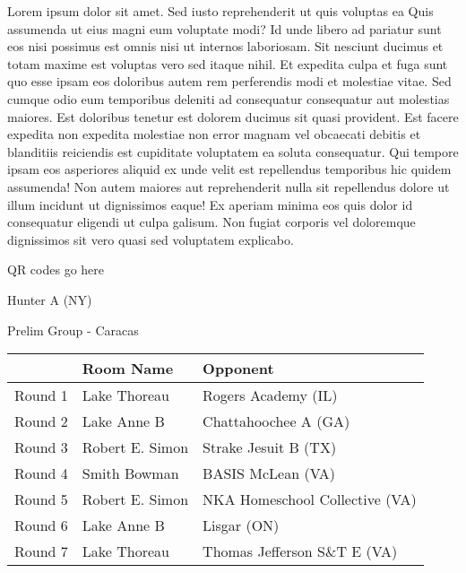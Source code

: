 \documentclass{article}%
\begin{document}
\vspace*{8pt}%
\linebreak%
\newline%
\newline%
Lorem ipsum dolor sit amet. Sed iusto reprehenderit ut quis voluptas ea Quis assumenda ut eius magni eum voluptate modi? Id unde libero ad pariatur sunt eos nisi possimus est omnis nisi ut internos laboriosam. Sit nesciunt ducimus et totam maxime est voluptas vero sed itaque nihil. Et expedita culpa et fuga sunt quo esse ipsam eos doloribus autem rem perferendis modi et molestiae vitae.\newline%
\newline%
Sed cumque odio eum temporibus deleniti ad consequatur consequatur aut molestias maiores. Est doloribus tenetur est dolorem ducimus sit quasi provident. Est facere expedita non expedita molestiae non error magnam vel obcaecati debitis et blanditiis reiciendis est cupiditate voluptatem ea soluta consequatur. Qui tempore ipsam eos asperiores aliquid ex unde velit est repellendus temporibus hic quidem assumenda!\newline%
\newline%
Non autem maiores aut reprehenderit nulla sit repellendus dolore ut illum incidunt ut dignissimos eaque! Ex aperiam minima eos quis dolor id consequatur eligendi ut culpa galisum. Non fugiat corporis vel doloremque dignissimos sit vero quasi sed voluptatem explicabo.\newline%
\newline%
%
\vspace*{30pt}%
\begin{center}%
\begin{Huge}%
QR codes go here%
\end{Huge}%
\end{center}%
\newpage%
%
\begin{center}%
\begin{Huge}%
Hunter A (NY)%
\end{Huge}%
\vspace*{8pt}%
\linebreak%
\begin{Large}%
Prelim Group {-} Caracas%
\end{Large}%
\end{center}%
\begin{tabularx}{\textwidth}{|c|Y|Y|}%
\hline%
&Room Name&Opponent\\%
\hline%
Round 1&Lake Thoreau&Rogers Academy (IL)\\%
Round 2&Lake Anne B&Chattahoochee A (GA)\\%
Round 3&Robert E. Simon&Strake Jesuit B (TX)\\%
Round 4&Smith Bowman&BASIS McLean (VA)\\%
Round 5&Robert E. Simon&NKA Homeschool Collective (VA)\\%
Round 6&Lake Anne B&Lisgar (ON)\\%
Round 7&Lake Thoreau&Thomas Jefferson S\&T E (VA)\\%
\hline%
\end{tabularx}%
\end{document}
